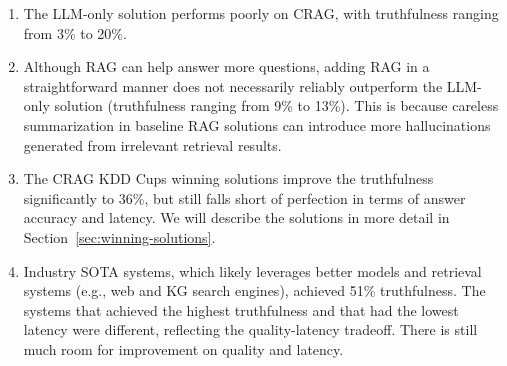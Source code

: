 \begin{enumerate}
    \item The LLM-only solution performs poorly on CRAG, with truthfulness ranging from 3\% to 20\%.
    \item Although RAG can help answer more questions, adding RAG in a straightforward manner does not necessarily reliably outperform the LLM-only solution (truthfulness ranging from 9\% to 13\%). This is because careless summarization in baseline RAG solutions can introduce more hallucinations generated from irrelevant retrieval results.
    \item The CRAG KDD Cups winning solutions improve the truthfulness significantly to 36\%, but still falls short of perfection in terms of answer accuracy and latency. We will describe the solutions in more detail in Section~\ref{sec:winning-solutions}.
    \item Industry SOTA systems, which likely leverages better models and retrieval systems (e.g., web and KG search engines), achieved 51\% truthfulness. The systems that achieved the highest truthfulness and that had the lowest latency were different, reflecting the quality-latency tradeoff. There is still much room for improvement on quality and latency.
\end{enumerate}